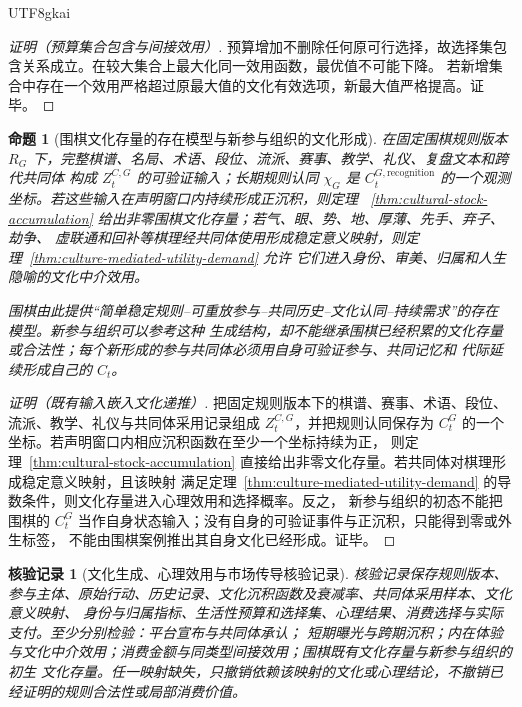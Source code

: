 \documentclass[12pt,a4paper,openany]{report}
\newtheorem{proposition}{命题}[chapter]
\newtheorem{Certificate}{核验记录}[chapter]
\begin{document}
\begin{CJK*}{UTF8}{gkai}
\begin{proof}[证明（预算集合包含与间接效用）]
预算增加不删除任何原可行选择，故选择集包含关系成立。在较大集合上最大化同一效用函数，最优值不可能下降。
若新增集合中存在一个效用严格超过原最大值的文化有效选项，新最大值严格提高。证毕。
\end{proof}

\begin{proposition}[围棋文化存量的存在模型与新参与组织的文化形成]
\label{prop:go-cultural-stock-reference}
在固定围棋规则版本 \(R_G\) 下，完整棋谱、名局、术语、段位、流派、赛事、教学、礼仪、复盘文本和跨代共同体
构成 \(Z_t^{C,G}\) 的可验证输入；长期规则认同 \(\chi_G\) 是
\(C_t^{G,\mathrm{recognition}}\) 的一个观测坐标。若这些输入在声明窗口内持续形成正沉积，则定理
~\ref{thm:cultural-stock-accumulation} 给出非零围棋文化存量；若气、眼、势、地、厚薄、先手、弃子、劫争、
虚联通和回补等棋理经共同体使用形成稳定意义映射，则定理~\ref{thm:culture-mediated-utility-demand} 允许
它们进入身份、审美、归属和人生隐喻的文化中介效用。

围棋由此提供“简单稳定规则--可重放参与--共同历史--文化认同--持续需求”的存在模型。新参与组织可以参考这种
生成结构，却不能继承围棋已经积累的文化存量或合法性；每个新形成的参与共同体必须用自身可验证参与、共同记忆和
代际延续形成自己的 \(C_t\)。
\end{proposition}

\begin{proof}[证明（既有输入嵌入文化递推）]
把固定规则版本下的棋谱、赛事、术语、段位、流派、教学、礼仪与共同体采用记录组成
\(Z_t^{C,G}\)，并把规则认同保存为 \(C_t^G\) 的一个坐标。若声明窗口内相应沉积函数在至少一个坐标持续为正，
则定理~\ref{thm:cultural-stock-accumulation} 直接给出非零文化存量。若共同体对棋理形成稳定意义映射，且该映射
满足定理~\ref{thm:culture-mediated-utility-demand} 的导数条件，则文化存量进入心理效用和选择概率。反之，
新参与组织的初态不能把围棋的 \(C_t^G\) 当作自身状态输入；没有自身的可验证事件与正沉积，只能得到零或外生标签，
不能由围棋案例推出其自身文化已经形成。证毕。
\end{proof}

\begin{Certificate}[文化生成、心理效用与市场传导核验记录]
核验记录保存规则版本、参与主体、原始行动、历史记录、文化沉积函数及衰减率、共同体采用样本、文化意义映射、
身份与归属指标、生活性预算和选择集、心理结果、消费选择与实际支付。至少分别检验：平台宣布与共同体承认；
短期曝光与跨期沉积；内在体验与文化中介效用；消费金额与同类型间接效用；围棋既有文化存量与新参与组织的初生
文化存量。任一映射缺失，只撤销依赖该映射的文化或心理结论，不撤销已经证明的规则合法性或局部消费价值。
\end{Certificate}


\end{CJK*}
\end{document}
